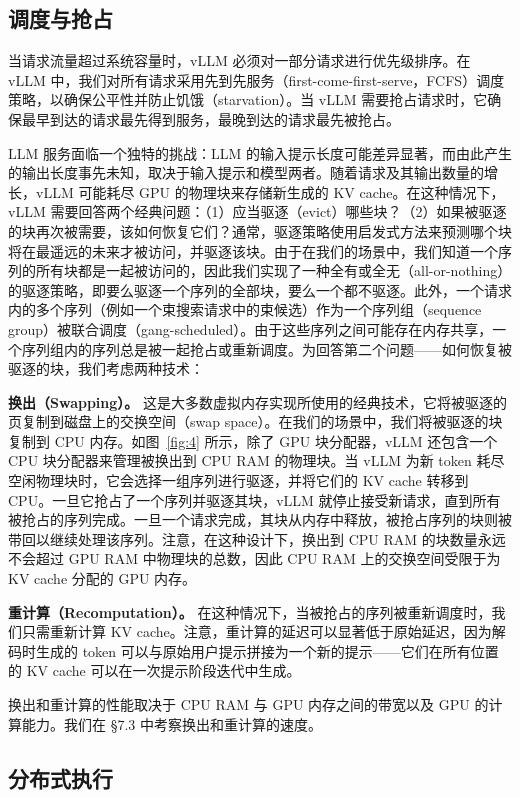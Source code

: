 \documentclass[11pt,UTF8,fontset=fandol]{ctexart}
\begin{document}
\subsection{调度与抢占}

当请求流量超过系统容量时，vLLM 必须对一部分请求进行优先级排序。在 vLLM 中，我们对所有请求采用先到先服务（first-come-first-serve，FCFS）调度策略，以确保公平性并防止饥饿（starvation）。当 vLLM 需要抢占请求时，它确保最早到达的请求最先得到服务，最晚到达的请求最先被抢占。

LLM 服务面临一个独特的挑战：LLM 的输入提示长度可能差异显著，而由此产生的输出长度事先未知，取决于输入提示和模型两者。随着请求及其输出数量的增长，vLLM 可能耗尽 GPU 的物理块来存储新生成的 KV cache。在这种情况下，vLLM 需要回答两个经典问题：（1）应当驱逐（evict）哪些块？（2）如果被驱逐的块再次被需要，该如何恢复它们？通常，驱逐策略使用启发式方法来预测哪个块将在最遥远的未来才被访问，并驱逐该块。由于在我们的场景中，我们知道一个序列的所有块都是一起被访问的，因此我们实现了一种全有或全无（all-or-nothing）的驱逐策略，即要么驱逐一个序列的全部块，要么一个都不驱逐。此外，一个请求内的多个序列（例如一个束搜索请求中的束候选）作为一个序列组（sequence group）被联合调度（gang-scheduled）。由于这些序列之间可能存在内存共享，一个序列组内的序列总是被一起抢占或重新调度。为回答第二个问题——如何恢复被驱逐的块，我们考虑两种技术：

\textbf{换出（Swapping）。} 这是大多数虚拟内存实现所使用的经典技术，它将被驱逐的页复制到磁盘上的交换空间（swap space）。在我们的场景中，我们将被驱逐的块复制到 CPU 内存。如图~\ref{fig:4} 所示，除了 GPU 块分配器，vLLM 还包含一个 CPU 块分配器来管理被换出到 CPU RAM 的物理块。当 vLLM 为新 token 耗尽空闲物理块时，它会选择一组序列进行驱逐，并将它们的 KV cache 转移到 CPU。一旦它抢占了一个序列并驱逐其块，vLLM 就停止接受新请求，直到所有被抢占的序列完成。一旦一个请求完成，其块从内存中释放，被抢占序列的块则被带回以继续处理该序列。注意，在这种设计下，换出到 CPU RAM 的块数量永远不会超过 GPU RAM 中物理块的总数，因此 CPU RAM 上的交换空间受限于为 KV cache 分配的 GPU 内存。

\textbf{重计算（Recomputation）。} 在这种情况下，当被抢占的序列被重新调度时，我们只需重新计算 KV cache。注意，重计算的延迟可以显著低于原始延迟，因为解码时生成的 token 可以与原始用户提示拼接为一个新的提示——它们在所有位置的 KV cache 可以在一次提示阶段迭代中生成。

换出和重计算的性能取决于 CPU RAM 与 GPU 内存之间的带宽以及 GPU 的计算能力。我们在 \S7.3 中考察换出和重计算的速度。

\subsection{分布式执行}
\end{document}
